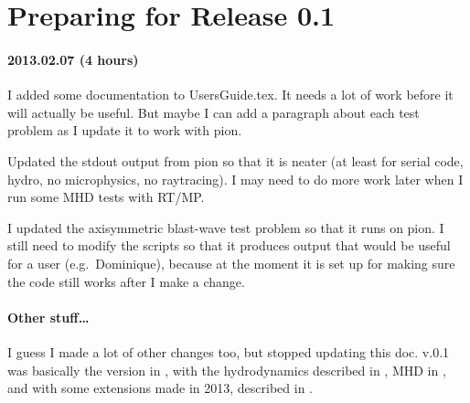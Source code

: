 \documentclass[a4paper,11pt]{article}
\begin{document}
\section{Preparing for Release 0.1}
\paragraph{2013.02.07 (4 hours)}
I added some documentation to UsersGuide.tex.
It needs a lot of work before it will actually be useful.
But maybe I can add a paragraph about each test problem as I update it to work with pion.

Updated the stdout output from pion so that it is neater (at least for serial code, hydro, no microphysics, no raytracing).  I may need to do more work later when I run some MHD tests with RT/MP.

I updated the axisymmetric blast-wave test problem so that it runs on pion.
I still need to modify the scripts so that it produces output that would be useful for a user (e.g.\ Dominique), because at the moment it is set up for making sure the code still works after I make a change.

\paragraph{Other stuff\ldots}
I guess I made a lot of other changes too, but stopped updating this doc.
\pion{} v.0.1 was basically the version in \citet{Mac12}, with the hydrodynamics described in \citet{MacLim10}, MHD in \citet{MacLim11}, and with some extensions made in 2013, described in \citet{MacLanGva13}.





\end{document}
